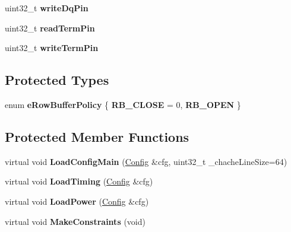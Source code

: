 \begin{DoxyCompactItemize}
\item 
\hypertarget{classMemParam_ab3cfad2f314729e214a28f295266e380}{uint32\-\_\-t {\bfseries write\-Dq\-Pin}}\label{classMemParam_ab3cfad2f314729e214a28f295266e380}

\item 
\hypertarget{classMemParam_adc50244312a52ec3b3f344abfacfb498}{uint32\-\_\-t {\bfseries read\-Term\-Pin}}\label{classMemParam_adc50244312a52ec3b3f344abfacfb498}

\item 
\hypertarget{classMemParam_a8d27096c16504516e3813ae36faaef88}{uint32\-\_\-t {\bfseries write\-Term\-Pin}}\label{classMemParam_a8d27096c16504516e3813ae36faaef88}

\end{DoxyCompactItemize}
\subsection*{Protected Types}
\begin{DoxyCompactItemize}
\item 
enum {\bfseries e\-Row\-Buffer\-Policy} \{ {\bfseries R\-B\-\_\-\-C\-L\-O\-S\-E} = 0, 
{\bfseries R\-B\-\_\-\-O\-P\-E\-N}
 \}
\end{DoxyCompactItemize}
\subsection*{Protected Member Functions}
\begin{DoxyCompactItemize}
\item 
\hypertarget{classMemParam_af1c75c2ba89c790a4102e9f44ecf8e96}{virtual void {\bfseries Load\-Config\-Main} (\hyperlink{classConfig}{Config} \&cfg, uint32\-\_\-t \-\_\-chache\-Line\-Size=64)}\label{classMemParam_af1c75c2ba89c790a4102e9f44ecf8e96}

\item 
\hypertarget{classMemParam_a5f8f0797e203e3562332ca9edfc08ce0}{virtual void {\bfseries Load\-Timing} (\hyperlink{classConfig}{Config} \&cfg)}\label{classMemParam_a5f8f0797e203e3562332ca9edfc08ce0}

\item 
\hypertarget{classMemParam_a10948c6cf515ab294e27c81c518f939e}{virtual void {\bfseries Load\-Power} (\hyperlink{classConfig}{Config} \&cfg)}\label{classMemParam_a10948c6cf515ab294e27c81c518f939e}

\item 
\hypertarget{classMemParam_a6fca0941062e92c47342183545bab929}{virtual void {\bfseries Make\-Constraints} (void)}\label{classMemParam_a6fca0941062e92c47342183545bab929}

\end{DoxyCompactItemize}
